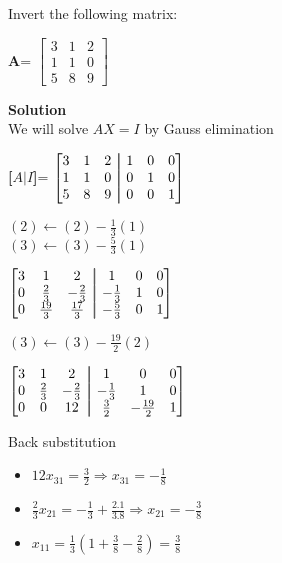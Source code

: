 \begin{exercise}{6} %
Invert the following matrix:
\begin{center}
\textbf{A}= 
$\begin{bmatrix}
3&1&2\\ 
1&1&0\\
5&8&9
\end{bmatrix}
$ 
\end{center}
\textbf{Solution}\\

We will solve $AX=I$ by Gauss elimination\\
\begin{center}
\textbf{[$A \vert I$]}= 
$\begin{bmatrix}
3&1&2 &\aug&1&0&0\\ 
1&1&0 &\aug& 0&1&0\\
5&8&9 &\aug& 0&0&1
\end{bmatrix}
$ \\
\end{center}
$(2) \leftarrow (2) - \frac{1}{3}(1)$\\
$(3) \leftarrow (3) - \frac{5}{3}(1)$\\
\begin{center}
$\begin{bmatrix}
3&1&2 &\aug&1&0&0\\ 
0&\frac{2}{3}&-\frac{2}{3} &\aug&-\frac{1}{3}&1&0\\
0&\frac{19}{3}&\frac{17}{3} &\aug& -\frac{5}{3}&0&1
\end{bmatrix}
$ \\
\end{center}
$(3) \leftarrow (3) - \frac{19}{2}(2)$\\
\begin{center}
$\begin{bmatrix}
3&1&2 &\aug&1&0&0\\ 
0&\frac{2}{3}&-\frac{2}{3} &\aug&-\frac{1}{3}&1&0\\
0&0&12 &\aug& \frac{3}{2}&-\frac{19}{2}&1
\end{bmatrix}
$ \\
\end{center}

Back substitution
\begin{itemize}
\item $12x_{31} = \frac{3}{2} \Rightarrow x_{31} = -\frac{1}{8}$
\item $\frac{2}{3}x_{21} = -\frac{1}{3} + \frac{2.1}{3.8} \Rightarrow x_{21} = -\frac{3}{8}$
\item $x_{11} = \frac{1}{3}(1+\frac{3}{8}-\frac{2}{8}) = \frac{3}{8}$
\end{itemize}


\end{exercise}
